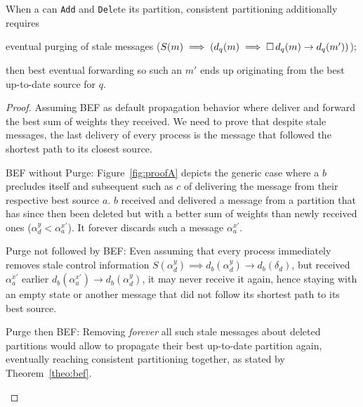 \begin{theorem}
%
When a \process can \texttt{Add} and \texttt{Del}ete its partition,
consistent partitioning additionally requires
\begin{inparaenum}[(i)]
\item eventual purging of stale messages ($S(m)
  \implies (d_q(m) \implies \square\, d_q(m) \rightarrow
  d_q(m'))$);
\item then best eventual forwarding so such an $m'$ ends up
  originating from the best up-to-date source for $q$.
\end{inparaenum}
\end{theorem}

\begin{proof}
  Assuming BEF as default propagation behavior where \processes
  deliver and forward the best sum of weights they received. We need
  to prove that despite stale messages, the last delivery of every
  process is the message that followed the shortest path to its
  closest source.
  \begin{asparadesc}
  \item [BEF without Purge:] Figure~\ref{fig:proofA} depicts the
    generic case where a \process $b$ precludes itself and subsequent
    \processes such as $c$ of delivering the message from their
    respective best source $a$. \Process $b$ received and delivered a
    message from a partition that has since then been deleted but with
    a better sum of weights than newly received ones ($\alpha_d^y <
    \alpha_a^{x'}$). It forever discards such a message
    $\alpha_a^{x'}$.
  \item [Purge not followed by BEF:] Even assuming that every process
    immediately removes stale control information $S(\alpha_d^y)
    \implies d_b(\alpha_d^y) \rightarrow d_b(\delta_d)$, but received
    $\alpha^{x'}_a$ earlier $d_b(\alpha^{x'}_a) \rightarrow
    d_b(\alpha^y_d)$, it may never receive it again, hence staying
    with an empty state or another message that did not follow its
    shortest path to its best source.
  \item [Purge then BEF:] Removing \emph{forever} all such stale
    messages about deleted partitions would allow \processes to
    propagate their best up-to-date partition again, eventually
    reaching consistent partitioning together, as stated by
    Theorem~\ref{theo:bef}.
  \end{asparadesc}
\end{proof}

